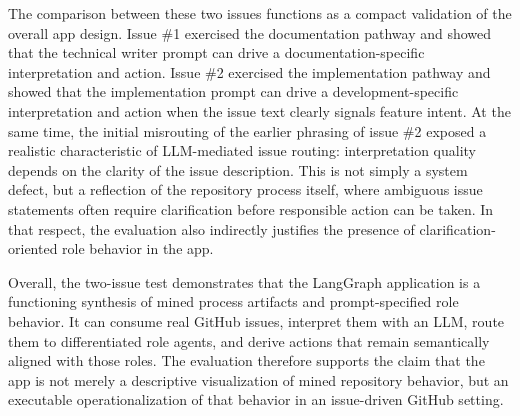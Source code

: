 \documentclass[11pt,a4paper]{article}
\begin{document}
The comparison between these two issues functions as a compact validation of the overall app design. Issue \#1 exercised the documentation pathway and showed that the technical writer prompt can drive a documentation-specific interpretation and action. Issue \#2 exercised the implementation pathway and showed that the implementation prompt can drive a development-specific interpretation and action when the issue text clearly signals feature intent. At the same time, the initial misrouting of the earlier phrasing of issue \#2 exposed a realistic characteristic of LLM-mediated issue routing: interpretation quality depends on the clarity of the issue description. This is not simply a system defect, but a reflection of the repository process itself, where ambiguous issue statements often require clarification before responsible action can be taken. In that respect, the evaluation also indirectly justifies the presence of clarification-oriented role behavior in the app.

Overall, the two-issue test demonstrates that the LangGraph application is a functioning synthesis of mined process artifacts and prompt-specified role behavior. It can consume real GitHub issues, interpret them with an LLM, route them to differentiated role agents, and derive actions that remain semantically aligned with those roles. The evaluation therefore supports the claim that the app is not merely a descriptive visualization of mined repository behavior, but an executable operationalization of that behavior in an issue-driven GitHub setting.
\end{document}
